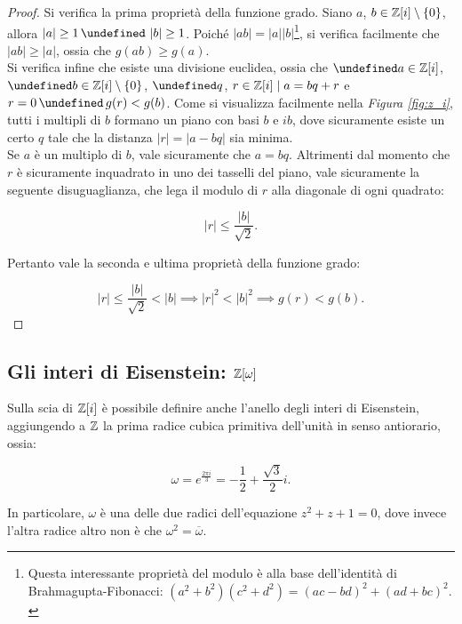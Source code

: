\documentclass[a4paper]{article}
\let\oldforall\forall
\let\forall\undefined
\DeclareMathOperator{\forall}{\oldforall}
\let\oldexists\exists
\let\exists\undefined
\DeclareMathOperator{\exists}{\oldexists}
\let\oldland\land
\let\land\undefined
\DeclareMathOperator{\land}{\oldland}
\let\oldlor\lor
\let\lor\undefined
\DeclareMathOperator{\lor}{\oldlor}
\begin{document}
\begin{proof}
    Si verifica la prima proprietà della funzione grado. Siano $a$, $b \in \mathbb{Z}[i] \setminus \{0\}$,
    allora $\left|a\right| \geq 1 \,\land\, \left|b\right| \geq 1$. Poiché
    $\left|ab\right| = \left|a\right|\left|b\right|$\footnote{Questa interessante proprietà del modulo è alla base dell'identità di Brahmagupta-Fibonacci: $(a^2 + b^2)(c^2 + d^2) = (ac-bd)^2 + (ad+bc)^2.$}, si verifica facilmente che
    $\left|ab\right| \geq \left|a\right|$, ossia che $g(ab) \geq g(a)$. \\

    Si verifica infine che esiste una divisione euclidea, ossia che
    $\forall a \in \ZZ[i]$, $\forall b \in \ZZ[i] \setminus \{0\}$, $\exists q$, $r \in \mathbb{Z}[i] \mid a = bq + r$ e $r=0 \,\lor\, g(r) < g(b)$.
    Come si visualizza facilmente nella \textit{Figura \ref{fig:z_i}},
    tutti i multipli di $b$ formano un piano con basi $b$ e $ib$, dove
    sicuramente esiste un certo $q$ tale che la distanza $\left|r\right| = \left|a-bq\right|$ sia minima. \\

    Se $a$ è un multiplo di $b$, vale sicuramente che $a = bq$. Altrimenti dal momento che $r$ è sicuramente inquadrato in uno dei tasselli del piano, vale
    sicuramente la seguente disuguaglianza, che lega il modulo di $r$ alla diagonale di
    ogni quadrato:

    \[\left|r\right| \leq \frac{\left|b\right|}{\sqrt{2}}.\]

    Pertanto vale la seconda e ultima proprietà della funzione grado:

    \[\left|r\right| \leq \frac{\left|b\right|}{\sqrt{2}} < \left|b\right| \implies \left|r\right|^2 < \left|b\right|^2 \implies g(r) < g(b).\]
\end{proof}

\subsection{Gli interi di Eisenstein: $\mathbb{Z}[\omega]$}

Sulla scia di $\mathbb{Z}[i]$ è possibile definire anche l'anello degli
interi di Eisenstein, aggiungendo a $\mathbb{Z}$ la prima radice cubica
primitiva dell'unità in senso antiorario, ossia:

\[\omega = e^{\frac{2\pi i}{3}} = -\frac{1}{2} + \frac{\sqrt{3}}{2}i.\]

In particolare, $\omega$ è una delle due radici dell'equazione
$z^2 + z + 1 = 0$, dove invece l'altra radice altro non è che
$\omega^2 = \overline{\omega}$.
\end{document}
